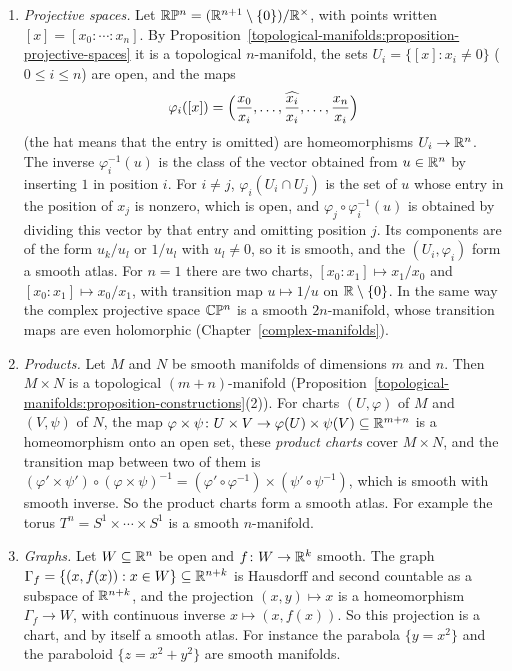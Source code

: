 \begin{example}
\begin{enumerate}
\[\]
This map is smooth on $\RR^n \setminus \{0\}$ and is its own inverse, so the two charts are compatible and form a smooth atlas of $S^n$.
\item \emph{Projective spaces.} Let $\mathbb{R}\mathbb{P}^n = (\mathbb{R}^{n+1} \setminus \{0\})/\mathbb{R}^\times$, with points written $[x] = [x_0 : \cdots : x_n]$. By
Proposition~\ref{topological-manifolds:proposition-projective-spaces} it is a topological $n$-manifold, the sets $U_i = \{[x] : x_i \neq 0\}$ ($0 \leq i \leq n$)
are open, and the maps
\[
\varphi_i([x]) = \Bigl(\frac{x_0}{x_i}, \ldots, \widehat{\frac{x_i}{x_i}}, \ldots, \frac{x_n}{x_i}\Bigr)
\]
(the hat means that the entry is omitted) are homeomorphisms $U_i \to \mathbb{R}^n$. The inverse $\varphi_i^{-1}(u)$ is the class of the vector obtained from
$u \in \mathbb{R}^n$ by inserting $1$ in position $i$. For $i \neq j$, $\varphi_i(U_i \cap U_j)$ is the set of $u$ whose entry in the position of $x_j$ is nonzero,
which is open, and $\varphi_j \circ \varphi_i^{-1}(u)$ is obtained by dividing this vector by that entry and omitting position $j$. Its components are of the
form $u_k/u_l$ or $1/u_l$ with $u_l \neq 0$, so it is smooth, and the $(U_i, \varphi_i)$ form a smooth atlas. For $n = 1$ there are two charts,
$[x_0 : x_1] \mapsto x_1/x_0$ and $[x_0 : x_1] \mapsto x_0/x_1$, with transition map $u \mapsto 1/u$ on $\mathbb{R} \setminus \{0\}$. In the same way the complex
projective space $\mathbb{C}\mathbb{P}^n$ is a smooth $2n$-manifold, whose transition maps are even holomorphic (Chapter~\ref{complex-manifolds}).
\item \emph{Products.} Let $M$ and $N$ be smooth manifolds of dimensions $m$ and $n$. Then $M \times N$ is a topological $(m + n)$-manifold
(Proposition~\ref{topological-manifolds:proposition-constructions}(2)). For charts $(U, \varphi)$ of $M$ and $(V, \psi)$ of $N$, the map
$\varphi \times \psi \colon U \times V \to \varphi(U) \times \psi(V) \subseteq \mathbb{R}^{m+n}$ is a homeomorphism onto an open set, these \emph{product charts} cover
$M \times N$, and the transition map between two of them is
$(\varphi' \times \psi') \circ (\varphi \times \psi)^{-1} = (\varphi' \circ \varphi^{-1}) \times (\psi' \circ \psi^{-1})$, which is smooth with smooth inverse. So
the product charts form a smooth atlas. For example the torus $T^n = S^1 \times \cdots \times S^1$ is a smooth $n$-manifold.
\item \emph{Graphs.} Let $W \subseteq \mathbb{R}^n$ be open and $f \colon W \to \mathbb{R}^k$ smooth. The graph $\Gamma_f = \{(x, f(x)) : x \in W\} \subseteq \mathbb{R}^{n+k}$ is
Hausdorff and second countable as a subspace of $\mathbb{R}^{n+k}$, and the projection $(x, y) \mapsto x$ is a homeomorphism $\Gamma_f \to W$, with continuous
inverse $x \mapsto (x, f(x))$. So this projection is a chart, and by itself a smooth atlas. For instance the parabola $\{y = x^2\}$ and the paraboloid
$\{z = x^2 + y^2\}$ are smooth manifolds.
\end{enumerate}
\end{example}

